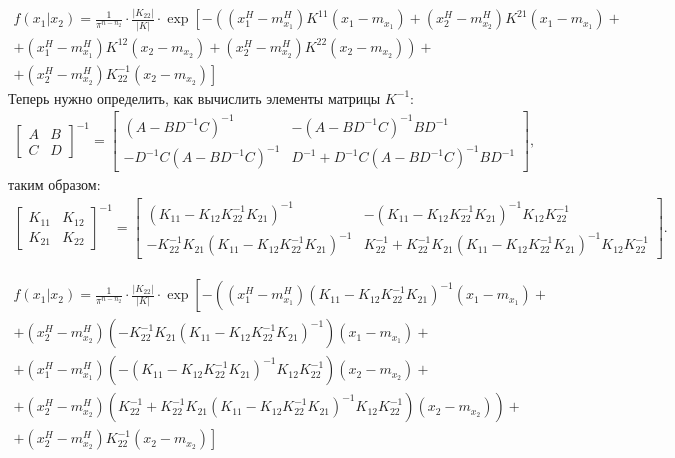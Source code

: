 \documentclass[11pt]{article}
\begin{document}
\begin{equation*}
\begin{gathered}
f(x_1|x_2)=\frac{1}{\pi^{n-n_2}}\cdot \frac{|K_{22}|}{|K|}\cdot \exp \left[-\left((x_1^H-m_{x_1}^H)K^{11}(x_1-m_{x_1})+(x_2^H-m_{x_2}^H)K^{21}(x_1-m_{x_1})+
\right. \right.
\\
\left.+(x_1^H-m_{x_1}^H)K^{12}(x_2-m_{x_2})+(x_2^H-m_{x_2}^H)K^{22}(x_2-m_{x_2})\right)+
\\
\left.
+(x_2^H-m_{x_2}^H)K_{22}^{-1}(x_2-m_{x_2})\right]
\end{gathered}
\end{equation*}
Теперь нужно определить, как вычислить элементы матрицы $K^{-1}$:
\begin{align}
\begin{bmatrix}
A& B\\
C& D
\end{bmatrix}^{-1}
=
\begin{bmatrix}
(A-BD^{-1}C)^{-1} & -(A-BD^{-1}C)^{-1}BD^{-1}\\
-D^{-1}C(A-BD^{-1}C)^{-1} & D^{-1}+D^{-1}C(A-BD^{-1}C)^{-1}BD^{-1}
\end{bmatrix},
\nonumber
\end{align}
таким образом:
\begin{align}
\begin{bmatrix}
K_{11} & K_{12}\\
K_{21} & K_{22}
\end{bmatrix}^{-1}
=
\begin{bmatrix}
(K_{11}-K_{12}K_{22}^{-1}K_{21})^{-1} & -(K_{11}-K_{12}K_{22}^{-1}K_{21})^{-1}K_{12}K_{22}^{-1}\\
-K_{22}^{-1}K_{21}(K_{11}-K_{12}K_{22}^{-1}K_{21})^{-1} & K_{22}^{-1}+K_{22}^{-1}K_{21}(K_{11}-K_{12}K_{22}^{-1}K_{21})^{-1}K_{12}K_{22}^{-1}
\end{bmatrix}
\nonumber.
\end{align}

\begin{equation*}
\begin{gathered}
f(x_1|x_2)=\frac{1}{\pi^{n-n_2}}\cdot \frac{|K_{22}|}{|K|}\cdot \exp \left[-\left((x_1^H-m_{x_1}^H)(K_{11}-K_{12}K_{22}^{-1}K_{21})^{-1}(x_1-m_{x_1})+ \right.\right. 
\\
+(x_2^H-m_{x_2}^H)(-K_{22}^{-1}K_{21}(K_{11}-K_{12}K_{22}^{-1}K_{21})^{-1})(x_1-m_{x_1})+
\\
+(x_1^H-m_{x_1}^H)(-(K_{11}-K_{12}K_{22}^{-1}K_{21})^{-1}K_{12}K_{22}^{-1})(x_2-m_{x_2})+
\\
\left.+(x_2^H-m_{x_2}^H)(K_{22}^{-1}+K_{22}^{-1}K_{21}(K_{11}-K_{12}K_{22}^{-1}K_{21})^{-1}K_{12}K_{22}^{-1})(x_2-m_{x_2})\right)+
\\
\left.+(x_2^H-m_{x_2}^H)K_{22}^{-1}(x_2-m_{x_2})\right]
\end{gathered}
\end{equation*}
\end{document}
